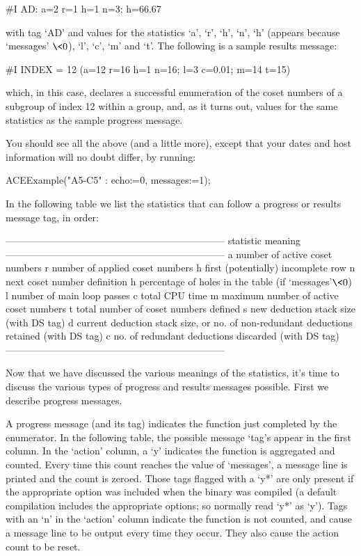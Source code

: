 \beginexample
#I  AD: a=2 r=1 h=1 n=3; h=66.67%
\endexample

with tag `AD' and values for the statistics `a', `r',  `h',  `n',  `h'
(appears because `messages' $\<  0$),  `l',  `c',  `m'  and  `t'.  The
following is a sample results message:

\beginexample
#I  INDEX = 12 (a=12 r=16 h=1 n=16; l=3 c=0.01; m=14 t=15)
\endexample

which, in this case, declares a successful enumeration  of  the  coset
numbers of a subgroup of index 12 within a group,  and,  as  it  turns
out, values for the same statistics as the sample progress message.

You should see all the above (and a little  more),  except  that  your
dates and host information will no doubt differ, by running:

\beginexample
ACEExample("A5-C5" : echo:=0, messages:=1);
\endexample

In the following table we  list  the  statistics  that  can  follow  a
progress or results message tag, in order:

\begintt
--------------------------------------------------------------------
statistic   meaning
--------------------------------------------------------------------
a           number of active coset numbers
r           number of applied coset numbers
h           first (potentially) incomplete row
n           next coset number definition
h           percentage of holes in the table (if `messages'$ \< 0$) 
l           number of main loop passes
c           total CPU time
m           maximum number of active coset numbers
t           total number of coset numbers defined
s           new deduction stack size (with DS tag)
d           current deduction stack size, or
              no. of non-redundant deductions retained (with DS tag)
c           no. of redundant deductions discarded (with DS tag)
--------------------------------------------------------------------
\endtt

Now that we have discussed the various  meanings  of  the  statistics,
it's time to  discuss  the  various  types  of  progress  and  results
messages possible. First we describe progress messages.


A progress message (and its tag) indicates the function just completed
by the enumerator. In the following table, the possible message `tag's
appear in the first column. In the `action' column,  a  `y'  indicates
the function is aggregated and counted. Every time this count  reaches
the value of `messages', a message line is printed and  the  count  is
zeroed. Those tags flagged  with  a  `y*'  are  only  present  if  the
appropriate option was included when the {\ACE} binary was compiled (a
default compilation includes the appropriate options; so normally read
`y*' as `y'). Tags with an `n' in the  `action'  column  indicate  the
function is not counted, and cause a message line to be  output  every
time they occur. They also cause the action count to be reset.

